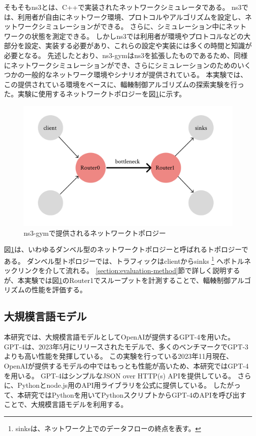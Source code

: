\documentclass[a4paper,11pt]{jreport}
\newcommand{\figref}[1]{図\ref{#1}}
\newcommand{\secref}[1]{\ref{#1}節}
\begin{document}
そもそもns3とは、C++で実装されたネットワークシミュレータである。
ns3では、利用者が自由にネットワーク環境、プロトコルやアルゴリズムを設定し、ネットワークシミュレーションができる。
さらに、シミュレーション中にネットワークの状態を測定できる。
しかしns3では利用者が環境やプロトコルなどの大部分を設定、実装する必要があり、これらの設定や実装には多くの時間と知識が必要となる。
先述したとおり、ns3-gymはns3を拡張したものであるため、同様にネットワークシミュレーションができ、さらにシミュレーションのためのいくつかの一般的なネットワーク環境やシナリオが提供されている。
本実験では、この提供されている環境をベースに、輻輳制御アルゴリズムの探索実験を行った。実験に使用するネットワークトポロジーを\figref{figure:network-topology}に示す。
\begin{figure}[htbp]
  \centering
  \includegraphics[width=0.6\linewidth]{fig/chap04/network-topology.png}
  \caption{ns3-gymで提供されるネットワークトポロジー}
  \label{figure:network-topology}
\end{figure}
\figref{figure:network-topology}は、いわゆるダンベル型のネットワークトポロジーと呼ばれるトポロジーである。
ダンベル型トポロジーでは、トラフィックはclientからsinks
\footnote{sinksは、ネットワーク上でのデータフローの終点を表す。}
へボトルネックリンクを介して流れる。
\secref{section:evaluation-method}で詳しく説明するが、本実験では\figref{figure:network-topology}のRouter1でスループットを計測することで、輻輳制御アルゴリズムの性能を評価する。

\subsection{大規模言語モデル}

本研究では、大規模言語モデルとしてOpenAIが提供するGPT-4を用いた。
GPT-4\cite{gpt4}は、2023年5月にリリースされたモデルで、多くのベンチマークでGPT-3\cite{gpt3}よりも高い性能を発揮している。
この実験を行っている2023年11月現在、OpenAIが提供するモデルの中ではもっとも性能が高いため、本研究ではGPT-4を用いる。
GPT-4はシンプルなJSON over HTTP(s) APIを提供している。
さらに、Pythonとnode.js用のAPI用ライブラリを公式に提供している。
したがって、本研究ではPythonを用いてPythonスクリプトからGPT-4のAPIを呼び出すことで、大規模言語モデルを利用する。
\end{document}
